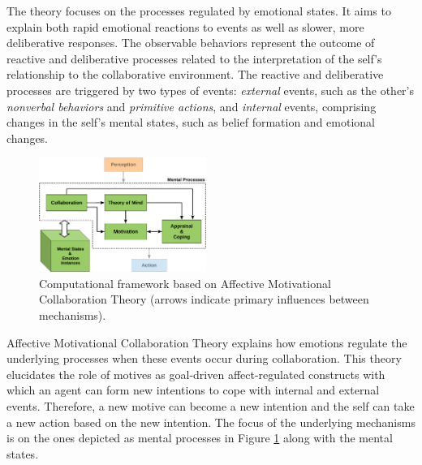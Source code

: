 \documentclass[journal, 11pt]{IEEEtran}
\begin{document}
The theory focuses on the processes regulated by emotional states. It aims to
explain both rapid emotional reactions to events as well as slower, more
deliberative responses. The observable behaviors represent the outcome of
reactive and deliberative processes related to the interpretation of the self's
relationship to the collaborative environment. The reactive and deliberative
processes are triggered by two types of events: \textit{external} events, such
as the other's \textit{nonverbal behaviors} and \textit{primitive actions}, and
\textit{internal} events, comprising changes in the self's mental states, such
as belief formation and emotional changes.

\begin{figure}[!t]
  \centering
  \includegraphics[width=0.485\textwidth]{figs/theory-general-croped.pdf}
  \caption{{\fontsize{10}{10}\selectfont Computational framework based on
  Affective Motivational Collaboration Theory (arrows indicate primary
  influences between mechanisms).}}
  \label{fig:cpm}
\end{figure}

Affective Motivational Collaboration Theory explains how emotions regulate the
underlying processes when these events occur during collaboration. This theory
elucidates the role of motives as goal-driven affect-regulated constructs with
which an agent can form new intentions to cope with internal and external
events. Therefore, a new motive can become a new intention and the self can take
a new action based on the new intention.  The focus of the underlying mechanisms
is on the ones depicted as mental processes in Figure \ref{fig:cpm} along with
the mental states.
\end{document}
